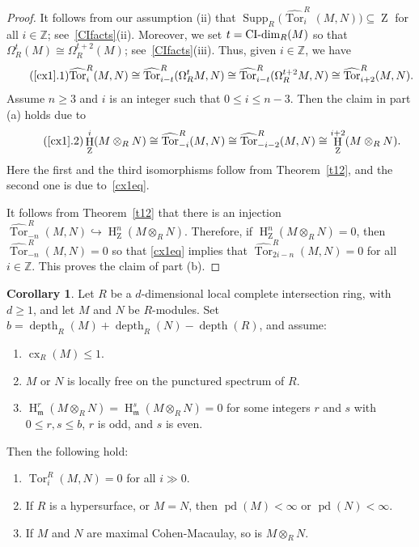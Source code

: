 \documentclass[11pt]{amsart}
\theoremstyle{definition}
\newtheorem{cor}[thm]{Corollary}
\theoremstyle{definition}
\numberwithin{equation}{section}
\newcommand{\fm}{\mathfrak{m}}
\newcommand{\ZZ}{\mathbb{Z}}
\DeclareMathOperator{\CI}{\textnormal{CI-dim}}
\DeclareMathOperator{\cx}{cx}
\DeclareMathOperator{\mz}{Z}
\DeclareMathOperator{\depth}{depth}
\DeclareMathOperator{\hh}{H}
\DeclareMathOperator{\pd}{pd}
\DeclareMathOperator{\Supp}{Supp}
\DeclareMathOperator{\Tor}{Tor}
\begin{document}
\begin{proof} It follows from our assumption (ii) that $\Supp_R\big(\widehat{\Tor}_i^R(M,N)\big)\subseteq\mz$ for all $i\in\ZZ$; see~\ref{CIfacts}(ii). Moreover, we set $t=\CI_R(M)$ so that $\Omega_R^t(M) \cong \Omega^{t+2}_R(M)$; see~\ref{CIfacts}(iii). Thus, given $i\in \ZZ$, we have
\begin{equation}\label{cx1eq} \tag{\ref*{cx1}.1}
\widehat{\Tor}_i^R(M,N)\cong \widehat{\Tor}_{i-t}^R(\Omega_R^tM,N)\cong \widehat{\Tor}_{i-t}^R(\Omega_R^{t+2}M,N) \cong \widehat{\Tor}_{i+2}^R(M,N). 
\end{equation}
Assume $n\geq 3$ and $i$ is an integer such that $0\leq i \leq n-3$. Then the claim in part (a) holds due to
\begin{equation}\label{cx2eq} \tag{\ref*{cx1}.2}
\hh^i_{\mz}(M\otimes_RN)\cong \widehat{\Tor}_{-i}^R(M,N) \cong \widehat{\Tor}_{-i-2}^R(M,N) \cong \hh^{i+2}_{\mz}(M\otimes_RN).
\end{equation}
Here the first and the third isomorphisms follow from Theorem~\ref{t12}, and the second one is due to~\eqref{cx1eq}.

It follows from Theorem~\ref{t12} that there is an injection $\widehat{\Tor}_{-n}^R(M,N)\hookrightarrow\hh^n_{\mz}(M\otimes_RN)$.
Therefore, if $\hh^n_{\mz}(M\otimes_RN)=0$, then $\widehat{\Tor}_{-n}^R(M,N)=0$ so that \eqref{cx1eq} implies that $\widehat{\Tor}_{2i-n}^R(M,N)=0$ for all $i\in\ZZ$. This proves the claim of part (b).
\end{proof}

\begin{cor}\label{cq} Let $R$ be a $d$-dimensional local complete intersection ring, with $d\geq 1$, and let $M$ and $N$ be $R$-modules. Set $b=\depth_{R}(M)+\depth_{R}(N)-\depth(R)$, and assume:
\begin{enumerate}[\rm(i)]
\item $\cx_R(M)\leq 1$.
\item $M$ or $N$ is locally free on the punctured spectrum of $R$. 
\item $\hh^r_{\fm}(M\otimes_RN)=\hh^s_{\fm}(M\otimes_RN)=0$ for some integers $r$ and $s$ with $0\leq r, s \leq b$, $r$ is odd, and $s$ is even.
\end{enumerate}	
Then the following hold:
\begin{enumerate}[\rm(a)]
\item $\Tor_i^R(M,N)=0$ for all $i\gg0$.
\item If $R$ is a hypersurface, or $M=N$, then $\pd(M)<\infty$ or $\pd(N)<\infty$.
\item If $M$ and $N$ are maximal Cohen-Macaulay, so is $M\otimes_RN$.
\end{enumerate}	
\end{cor}
\end{document}
